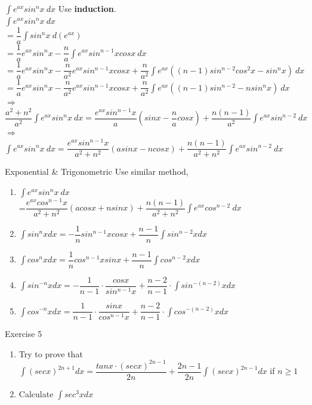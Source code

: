 \documentclass{beamer}
\begin{document}
\begin{frame}{$\int e^{ax}sin^nx\ dx$}
    \small
    Use \textbf{induction}.\\
    \bigskip
    $\int e^{ax}sin^nx\ dx$\\
    $=\dfrac{1}{a}\int sin^nx\ d(e^{ax})$\\
    $=\dfrac{1}{a}e^{ax}sin^nx-\dfrac{n}{a}\int e^{ax}sin^{n-1}xcosx\ dx$\\
    $= \dfrac{1}{a}e^{ax}sin^nx-\dfrac{n}{a^2} e^{ax}sin^{n-1}xcosx+\dfrac{n}{a^2}\int e^{ax}((n-1)sin^{n-2}cos^2x-sin^nx)\ dx$\\ $=\dfrac{1}{a}e^{ax}sin^nx-\dfrac{n}{a^2} e^{ax}sin^{n-1}xcosx+\dfrac{n}{a^2}\int e^{ax}((n-1)sin^{n-2}-nsin^nx)\ dx$\\
    \bigskip
    $\Rightarrow$\\
    \bigskip
    $\dfrac{a^2+n^2}{a^2}\int e^{ax}sin^nx\ dx=\dfrac{e^{ax}sin^{n-1}x}{a}(sinx-\dfrac{n}{a} cosx)+\dfrac{n(n-1)}{a^2}\int e^{ax}sin^{n-2}\ dx$\\
    \bigskip
    $\Rightarrow$\\
    \bigskip
    $\int e^{ax}sin^nx\ dx=\dfrac{e^{ax}sin^{n-1}x}{a^2+n^2}(asinx-ncosx)+\dfrac{n(n-1)}{a^2+n^2}\int e^{ax}sin^{n-2}\ dx$
    \normalsize
    
\end{frame}

\begin{frame}{Exponential \& Trigonometric}
    Use similar method,
    \begin{enumerate}
        \item $\int e^{ax}sin^nx\ dx$\\=$\dfrac{e^{ax}cos^{n-1}x}{a^2+n^2}(acosx+nsinx)+\dfrac{n(n-1)}{a^2+n^2}\int e^{ax}cos^{n-2}\ dx$
        \item $\int sin^nxdx=-\dfrac{1}{n}sin^{n-1}xcosx+\dfrac{n-1}{n}\int sin^{n-2}xdx$
        \item $\int cos^nxdx=\dfrac{1}{n}cos^{n-1}xsinx+\dfrac{n-1}{n}\int cos^{n-2}xdx$
        \item $\int sin^{-n}xdx=-\dfrac{1}{n-1}\cdot\dfrac{cosx}{sin^{n-1}x}+\dfrac{n-2}{n-1}\cdot\int sin^{-(n-2)}xdx$
        \item $\int cos^{-n}xdx=\dfrac{1}{n-1}\cdot\dfrac{sinx}{cos^{n-1}x}+\dfrac{n-2}{n-1}\cdot\int cos^{-(n-2)}xdx$
    \end{enumerate}
\end{frame}



\begin{frame}{Exercise 5}
    \begin{enumerate}
        \item Try to prove that $\int(secx)^{2n+1}dx=\dfrac{tanx\cdot(secx)^{2n-1}}{2n}+\dfrac{2n-1}{2n}\int(secx)^{2n-1}dx$ if $n\geq1$
        \item Calculate $\int sec^3xdx$
    \end{enumerate}
\end{frame}
\end{document}
